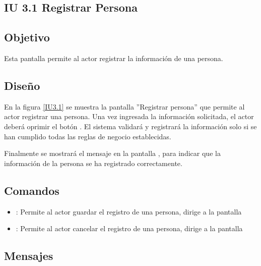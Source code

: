 \subsection{IU 3.1 Registrar Persona}

\subsection{Objetivo}
	Esta pantalla permite al actor registrar la información de una persona.
\subsection{Diseño}
	En la figura \ref{IU3.1} se muestra la pantalla ''Registrar persona'' que permite al actor registrar una persona.
	Una vez ingresada la información solicitada, el actor deberá oprimir el botón  . El sistema validará y registrará la información solo si se han cumplido todas las reglas de negocio establecidas.
	
	Finalmente se mostrará el mensaje  en la pantalla , para indicar que la información de la persona se ha registrado correctamente.

\label{IU3.1}
\subsection{Comandos}
\begin{itemize}
	\item {}: Permite al actor guardar el registro de una persona, dirige a la pantalla 
	\item {}: Permite al actor cancelar el registro de una persona, dirige a la pantalla 
\end{itemize}

\subsection{Mensajes}

